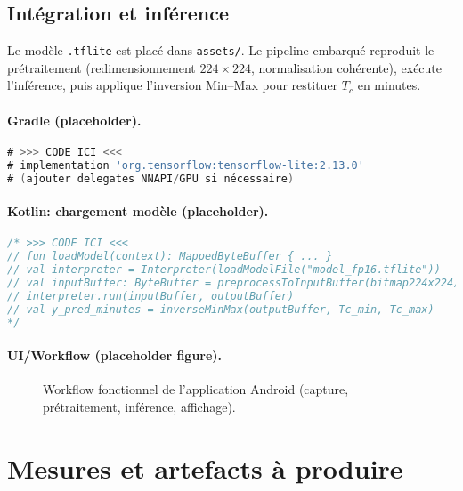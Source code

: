 \subsection{Intégration et inférence}
Le modèle \texttt{.tflite} est placé dans \texttt{assets/}. Le pipeline embarqué reproduit le prétraitement (redimensionnement \(224\times224\), normalisation cohérente), exécute l’inférence, puis applique l’inversion Min--Max pour restituer \(T_c\) en minutes.

\paragraph{Gradle (placeholder).}
\begin{lstlisting}[language=groovy,caption={(Placeholder) Dépendances Gradle TFLite},label={lst:gradle}]
# >>> CODE ICI <<<
# implementation 'org.tensorflow:tensorflow-lite:2.13.0'
# (ajouter delegates NNAPI/GPU si nécessaire)
\end{lstlisting}

\paragraph{Kotlin: chargement modèle (placeholder).}
\begin{lstlisting}[language=Java,caption={(Placeholder) Kotlin - chargement et exécution TFLite},label={lst:kotlin_tflite}]
/* >>> CODE ICI <<<
// fun loadModel(context): MappedByteBuffer { ... }
// val interpreter = Interpreter(loadModelFile("model_fp16.tflite"))
// val inputBuffer: ByteBuffer = preprocessToInputBuffer(bitmap224x224) // normalisation cohérente
// interpreter.run(inputBuffer, outputBuffer)
// val y_pred_minutes = inverseMinMax(outputBuffer, Tc_min, Tc_max)
*/
\end{lstlisting}

\paragraph{UI/Workflow (placeholder figure).}
\begin{figure}[h!]
    \centering
    \caption{Workflow fonctionnel de l’application Android (capture, prétraitement, inférence, affichage).}
    \label{fig:app_workflow}
\end{figure}

\section{Mesures et artefacts à produire}
\label{sec:mesures_artefacts}

